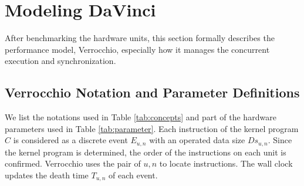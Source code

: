\documentclass[12pt]{extbook}
\begin{document}
\section{Modeling DaVinci}

After benchmarking the hardware units, this section formally describes the performance model, Verrocchio, especially how it manages the concurrent execution and synchronization.

\subsection{Verrocchio Notation and Parameter Definitions}

We list the notations used in Table \ref{tab:concepts} and part of the hardware parameters used in Table \ref{tab:parameter}. Each instruction of the kernel program $C$ is considered as a discrete event $E_{u, n}$ with an operated data size $Ds_{u, n}$. Since the kernel program is determined, the order of the instructions on each unit is confirmed. Verrocchio uses the pair of $u, n$ to locate instructions. The wall clock updates the death time $T_{u, n}$ of each event.
\end{document}
